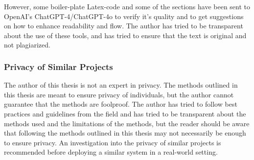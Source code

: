 However, some boiler-plate Latex-code and some of the sections have been sent to OpenAI's ChatGPT-4/ChatGPT-4o to verify it's quality and to get suggestions on how to enhance readability and flow. The author has tried to be transparent about the use of these tools, and has tried to ensure that the text is original and not plagiarized.

\subsubsection{Privacy of Similar Projects}
The author of this thesis is not an expert in privacy. The methods outlined in this thesis are meant to ensure privacy of individuals, but the author cannot guarantee that the methods are foolproof. The author has tried to follow best practices and guidelines from the field and has tried to be transparent about the methods used and the limitations of the methods, but the reader should be aware that following the methods outlined in this thesis may not necessarily be enough to ensure privacy. An investigation into the privacy of similar projects is recommended before deploying a similar system in a real-world setting.